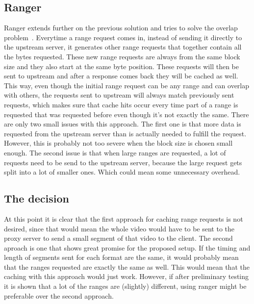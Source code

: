 \documentclass[twoside,openright]{uva-bachelor-thesis}
\begin{document}
\subsection{Ranger}
Ranger extends further on the previous solution and tries to solve the overlap
problem~\autocite{ranger}. Everytime a range request comes in, instead of
sending it directly to the upstream server, it generates other range requests
that together contain all the bytes requested. These new range requests are
always from the same block size and they also start at the same byte position.
These requests will then be sent to upstream and after a response comes back
they will be cached as well.  This way, even though the initial range request
can be any range and can overlap with others, the requests sent to upstream will
always match previously sent requests, which makes sure that cache hits occur
every time part of a range is requested that was requested before even though
it's not exactly the same. There are only two small issues with this approach.
The first one is that more data is requested from the upstream server than is
actually needed to fulfill the request. However, this is probably not too severe
when the block size is chosen small enough. The second issue is that when large
ranges are requested, a lot of requests need to be send to the upstream server,
because the large request gets split into a lot of smaller ones. Which could
mean some unnecessary overhead.

\subsection{The decision}
At this point it is clear that the first approach for caching range requests is
not desired, since that would mean the whole video would have to be sent to the
proxy server to send a small segment of that video to the client. The second
aproach is one that shows great promise for the proposed setup. If the timing
and length of segments sent for each format are the same, it would probably mean
that the ranges requested are exactly the same as well. This would mean that the
caching with this approach would just work. However, if after preliminary
testing it is shown that a lot of the ranges are (slightly) different, using
ranger might be preferable over the second approach.
\end{document}
